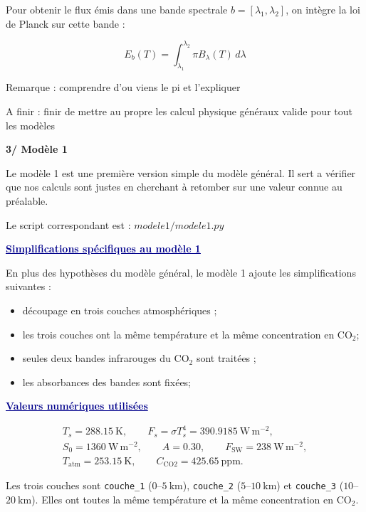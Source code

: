 \documentclass[11pt,a4paper]{article}
\newcommand{\code}[1]{\texttt{#1}}
\newcommand{\COtwo}{CO$_2$}
\newcommand{\fluxunit}{\mathrm{W\,m^{-2}}}
\newcommand{\bloc}[1]{\vspace{0.9em}\noindent\textcolor{DarkBlue}{\underline{\textbf{#1}}}\par\vspace{0.35em}}
\newcommand{\partietitre}[1]{%
    \vspace{1.1em}
    {\Large\bfseries\textcolor{DocRed}{#1}}\par
    \vspace{0.35em}
}
\begin{document}
Pour obtenir le flux émis dans une bande spectrale $b=[\lambda_1,\lambda_2]$, on intègre la loi de Planck sur cette bande :

\[
E_b(T)
=
\int_{\lambda_1}^{\lambda_2}
\pi B_\lambda(T)\,d\lambda
\]

\textcolor{green!50!black}{Remarque : comprendre d'ou viens le pi et l'expliquer}

\textcolor{green!50!black}{A finir : finir de mettre au propre les calcul physique généraux valide pour tout les modèles}

\partietitre{3/ Modèle 1}

Le modèle 1 est une première version simple du modèle général. Il sert a vérifier que nos calculs sont justes en cherchant à retomber sur une valeur connue au préalable.

Le script correspondant est : $modele1/modele1.py$

\bloc{Simplifications spécifiques au modèle 1}

En plus des hypothèses du modèle général, le modèle 1 ajoute les simplifications suivantes :

\begin{itemize}
    \item découpage en  trois couches atmosphériques ;
    \item les trois couches ont la même température et la même concentration en \COtwo{};
    \item seules deux bandes infrarouges du \COtwo{} sont traitées ;
    \item les absorbances des bandes sont fixées;
\end{itemize}

\bloc{Valeurs numériques utilisées}


\[
\begin{gathered}
T_s = 288.15\ \mathrm{K},
\qquad
F_s = \sigma T_s^4 = 390.9185\ \fluxunit,\\
S_0 = 1360\ \fluxunit,
\qquad
A = 0.30,
\qquad
F_{\mathrm{SW}} = 238\ \fluxunit,\\
T_{\mathrm{atm}} = 253.15\ \mathrm{K},
\qquad
C_{\mathrm{CO2}} = 425.65\ \mathrm{ppm}.
\end{gathered}
\]

Les trois couches sont \code{couche\_1} ($0$--$5\ \mathrm{km}$), \code{couche\_2} ($5$--$10\ \mathrm{km}$) et \code{couche\_3} ($10$--$20\ \mathrm{km}$). Elles ont toutes la même température et la même concentration en \COtwo.
\end{document}
